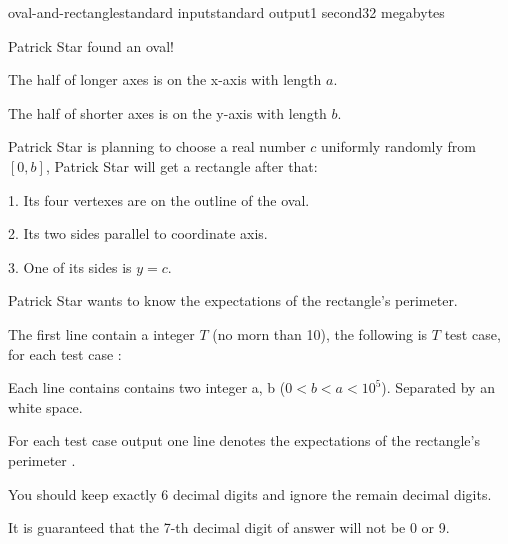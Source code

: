 \begin{problem}{oval-and-rectangle}{standard input}{standard output}{1 second}{32 megabytes}

Patrick Star found an oval!

The half of longer axes is on the x-axis with length $a$.

The half of shorter axes is on the y-axis with length $b$.

Patrick Star is planning to choose a real number $c$ uniformly randomly from $[0, b]$, Patrick Star will get a rectangle after that:

1. Its four vertexes are on the outline of the oval.

2. Its two sides parallel to coordinate axis.

3. One of its sides is $y = c$.

Patrick Star wants to know the expectations of the rectangle's perimeter.

\InputFile
The first line contain a integer $T$ (no morn than 10), the following is $T$ test case, for each test case :

Each line contains contains two integer a, b ($0 < b < a < 10^5$). Separated by an white space.

\OutputFile

For each test case output one line denotes the expectations of the rectangle's perimeter .

You should keep exactly 6 decimal digits and ignore the remain decimal digits. 

It is guaranteed that the 7-th decimal digit of answer will not be 0 or 9.

\Example

\begin{example}
%
\end{example}

\end{problem}

